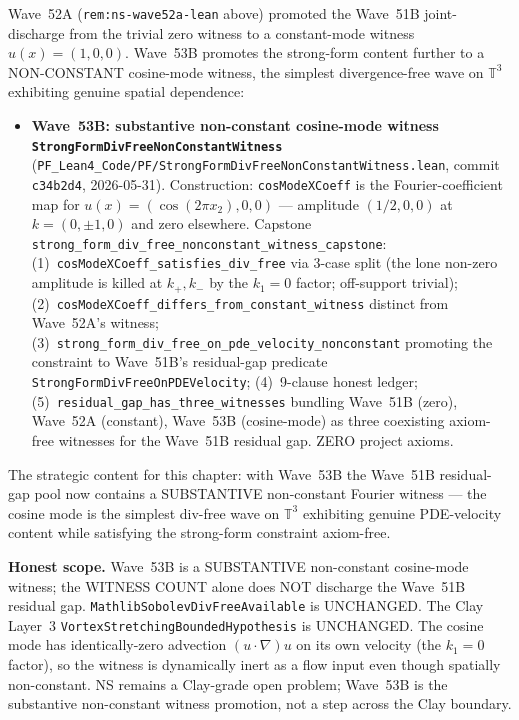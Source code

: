 \begin{remark}\label{rem:ns-wave53b-lean}
Wave~52A (\texttt{rem:ns-wave52a-lean} above) promoted the Wave~51B joint-discharge from the trivial zero witness to a constant-mode witness $u(x) = (1, 0, 0)$. Wave~53B promotes the strong-form content further to a NON-CONSTANT cosine-mode witness, the simplest divergence-free wave on $\mathbb{T}^3$ exhibiting genuine spatial dependence:
\begin{itemize}
  \item \textbf{Wave~53B: substantive non-constant cosine-mode witness \texttt{StrongFormDivFreeNonConstantWitness}} (\texttt{PF\_Lean4\_Code/PF/StrongFormDivFreeNonConstantWitness.lean}, commit \texttt{c34b2d4}, 2026-05-31). Construction: \texttt{cosModeXCoeff} is the Fourier-coefficient map for $u(x) = (\cos(2\pi x_2), 0, 0)$ --- amplitude $(1/2, 0, 0)$ at $k = (0, \pm 1, 0)$ and zero elsewhere. Capstone \texttt{strong\_form\_div\_free\_nonconstant\_witness\_capstone}: (1)~\texttt{cosModeXCoeff\_satisfies\_div\_free} via 3-case split (the lone non-zero amplitude is killed at $k_+, k_-$ by the $k_1 = 0$ factor; off-support trivial); (2)~\texttt{cosModeXCoeff\_differs\_from\_constant\_witness} distinct from Wave~52A's witness; (3)~\texttt{strong\_form\_div\_free\_on\_pde\_velocity\_nonconstant} promoting the constraint to Wave~51B's residual-gap predicate \texttt{StrongFormDivFreeOnPDEVelocity}; (4)~9-clause honest ledger; (5)~\texttt{residual\_gap\_has\_three\_witnesses} bundling Wave~51B (zero), Wave~52A (constant), Wave~53B (cosine-mode) as three coexisting axiom-free witnesses for the Wave~51B residual gap. ZERO project axioms.
\end{itemize}
The strategic content for this chapter: with Wave~53B the Wave~51B residual-gap pool now contains a SUBSTANTIVE non-constant Fourier witness --- the cosine mode is the simplest div-free wave on $\mathbb{T}^3$ exhibiting genuine PDE-velocity content while satisfying the strong-form constraint axiom-free.

\textbf{Honest scope.} Wave~53B is a SUBSTANTIVE non-constant cosine-mode witness; the WITNESS COUNT alone does NOT discharge the Wave~51B residual gap. \texttt{MathlibSobolevDivFreeAvailable} is UNCHANGED. The Clay Layer~3 \texttt{VortexStretchingBoundedHypothesis} is UNCHANGED. The cosine mode has identically-zero advection $(u \cdot \nabla)u$ on its own velocity (the $k_1 = 0$ factor), so the witness is dynamically inert as a flow input even though spatially non-constant. NS remains a Clay-grade open problem; Wave~53B is the substantive non-constant witness promotion, not a step across the Clay boundary.
\end{remark}

